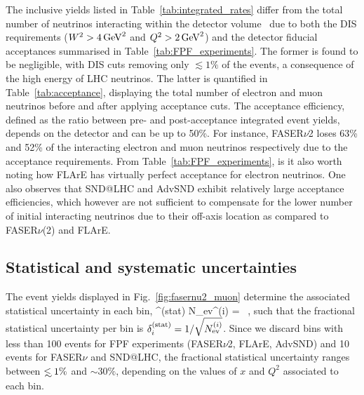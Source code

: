 The inclusive yields listed in Table~\ref{tab:integrated_rates}
differ from the total number of neutrinos interacting within the
detector volume~\cite{Feng:2022inv,Kling:2021gos} due to both the
DIS requirements  ($W^2 > 4\,{\rm GeV}^2$ and $Q^2 > 2\,{\rm GeV}^2$)
and the detector fiducial acceptances summarised in Table~\ref{tab:FPF_experiments}.
%
The former is found to be negligible, with DIS cuts removing
only  $\lesssim 1\%$ of the events, a consequence of the high energy of
LHC neutrinos.
%
The latter is quantified in Table~\ref{tab:acceptance}, displaying
the total number of electron and muon neutrinos before and after applying
acceptance cuts.
%
The acceptance efficiency, defined as the ratio between pre- and post-acceptance
integrated event yields, depends on the detector and can be up to 50\%.
%
For instance, FASER$\nu$2 loses 63\% and 52\% of the interacting electron and muon
neutrinos respectively due to the acceptance requirements.
%
From Table~\ref{tab:FPF_experiments}, is it also worth noting how FLArE has virtually
perfect acceptance for electron neutrinos.
%
One also observes that SND@LHC and AdvSND exhibit relatively
large acceptance efficiencies, which however are not sufficient to compensate for
the lower number of initial interacting neutrinos due to their off-axis location
as compared to FASER$\nu$(2) and FLArE.

\subsection{Statistical and systematic uncertainties}
\label{subsec:uncertainties}

The event yields displayed in Fig.~\ref{fig:fasernu2_muon} determine the associated
statistical uncertainty in each bin,
\be
\label{eq:statistical_uncertainties}
\delta^{\rm (stat)}  N_{\rm ev}^{(i)} =  \, ,
\ee
such that the fractional statistical uncertainty per bin is $\delta^{\rm (stat)}_i=1/\sqrt{N_{\rm ev}^{(i)}}$.
%
Since we discard bins with less than 100 events for FPF experiments (FASER$\nu$2, FLArE, AdvSND) and
10 events for FASER$\nu$ and SND@LHC, the fractional statistical uncertainty
ranges between $\lsim 1\%$ and $\sim 30\%$, depending on the values of
$x$ and $Q^2$ associated to each bin.

